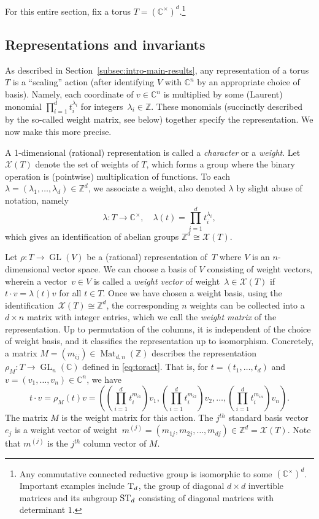 \documentclass[10pt,a4paper]{article}
\DeclareMathOperator{\GL}{GL}
\DeclareMathOperator{\Mat}{Mat}
\theoremstyle{definition}
\numberwithin{equation}{section}
\newcommand{\CC}{\mathbb{C}}
\newcommand{\ZZ}{\mathbb{Z}}
\begin{document}
For this entire section, fix a torus $T = (\CC^\times)^d$.\footnote{Any commutative connected reductive group is isomorphic to some $(\CC^\times)^d$. Important examples include ${\rm T}_d$, the group of diagonal $d \times d$ invertible matrices and its subgroup ${\rm ST}_d$ consisting of diagonal matrices with determinant $1$.}

%
\subsection{Representations and invariants}\label{subsec:rep inv tori}
%
As described in Section~\ref{subsec:intro-main-results}, any representation of a torus~$T$ is a ``scaling'' action
(after identifying $V$ with $\CC^n$ by an appropriate choice of basis).
Namely, each coordinate of $v \in \CC^n$ is multiplied by some (Laurent) monomial $\prod_{i=1}^d t_i^{\lambda_i}$ for integers~$\lambda_i \in \ZZ$.
These monomials (succinctly described by the so-called weight matrix, see below) together specify the representation. 
We now make this more precise.

A 1-dimensional (rational) representation is called a \emph{character} or a \emph{weight}.
Let $\mathcal{X}(T)$ denote the set of weights of $T$, which forms a group where the binary operation is  (pointwise) multiplication of functions.
To each $\lambda = (\lambda_1,\dots,\lambda_d) \in \ZZ^d$, we associate a weight, also denoted $\lambda$ by slight abuse of notation, namely
\[ \lambda\colon T \rightarrow \CC^\times, \quad \lambda(t) = \prod_{i=1}^d t_i^{\lambda_i}, \]
which gives an identification of abelian groups $\ZZ^d \cong \mathcal{X}(T)$.

Let $\rho \colon T \rightarrow \GL(V)$ be a (rational) representation of~$T$ where $V$ is an $n$-dimensional vector space.
We can choose a basis of $V$ consisting of weight vectors, wherein a vector~$v \in V$ is called a \emph{weight vector}
of weight~$\lambda \in \mathcal{X}(T)$ if $t \cdot v = \lambda(t) v$ for all $t \in T$.
Once we have chosen a weight basis, using the identification~$\mathcal{X}(T) \cong \ZZ^d$, the corresponding $n$ weights
can be collected into a $d \times n$ matrix with integer entries, which we call the \emph{weight matrix} of the representation.
Up to permutation of the columns, it is independent of the choice of weight basis, and it classifies the representation up to isomorphism.
Concretely, a matrix $M = (m_{ij}) \in \Mat_{d,n}(\ZZ)$ describes the representation $\rho_M \colon T \rightarrow \GL_n(\CC)$
defined in \eqref{eq:toract}.
That is, for $t = (t_1,\dots,t_d)$ and $v = (v_1,\dots,v_n) \in \CC^n$, we have
\[
 t \cdot v = \rho_M(t) v = \left( \left(\prod_{i=1}^d t_i^{m_{i1}}\right) v_1, \left(\prod_{i=1}^d t_i^{m_{i2}}\right) v_2, \dots, \left(\prod_{i=1}^d t_i^{m_{in}}\right) v_n \right).
\]
The matrix $M$ is the weight matrix for this action.
The $j^{th}$ standard basis vector~$e_j$ is a weight vector of weight~$m^{(j)} = (m_{1j}, m_{2j},\dots, m_{dj}) \in \ZZ^d = \mathcal{X}(T)$.
Note that $m^{(j)}$ is the $j^{th}$ column vector of $M$.
\end{document}
